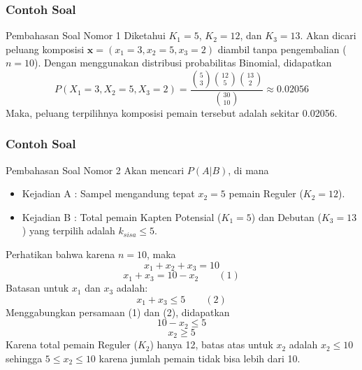 \documentclass[]{beamer}
\begin{document}
\begin{frame}
    \frametitle{Contoh Soal}
    \begin{exampleblock}{Pembahasan Soal Nomor 1}
        Diketahui $K_1=5$, $K_2 = 12$, dan $K_3 = 13$. Akan dicari peluang komposisi $\mathbf{x} = (x_1=3, x_2=5, x_3=2)$ diambil tanpa pengembalian ($n=10$). Dengan menggunakan distribusi probabilitas Binomial, didapatkan
        \begin{equation*}
            P(X_1=3,X_2=5,X_3=2) = \frac{\binom{5}{3}\binom{12}{5}\binom{13}{2}}{\binom{30}{10}} \approx \mathbf{0.02056}
        \end{equation*}
        Maka, peluang terpilihnya komposisi pemain tersebut adalah sekitar 0.02056.
    \end{exampleblock}
\end{frame}

\begin{frame}
    \frametitle{Contoh Soal}
    \scriptsize
    \begin{exampleblock}{Pembahasan Soal Nomor 2}
        Akan mencari $P(A | B)$, di mana
        \begin{itemize}
            \item Kejadian A : Sampel mengandung tepat $x_2=5$ pemain Reguler ($K_2=12$).
            \item Kejadian B : Total pemain Kapten Potensial ($K_1=5$) dan Debutan ($K_3=13$) yang terpilih adalah $k_{sisa} \le 5$. 
        \end{itemize}
        Perhatikan bahwa karena $n=10$, maka 
        \begin{equation*}
            x_1 + x_2 + x_3 = 10
        \end{equation*}
        \begin{equation*}
            x_1 + x_3 = 10 -  x_2    \qquad (1)
        \end{equation*}
        Batasan untuk $x_1$ dan $x_3$ adalah: 
        \begin{equation*}
            x_1 + x_3 \le 5 \qquad (2)
        \end{equation*} 
        Menggabungkan persamaan (1) dan (2), didapatkan
        \begin{equation*}
            10-x_2 \le 5
        \end{equation*}
        \begin{equation*}
            x_2 \ge 5
        \end{equation*}
        Karena total pemain Reguler ($K_2$) hanya 12, batas atas untuk $x_2$ adalah $x_2 \le 10$ sehingga $5\le x_2 \leq 10$ karena jumlah pemain tidak bisa lebih dari 10.
    \end{exampleblock}
\end{frame}
\end{document}
